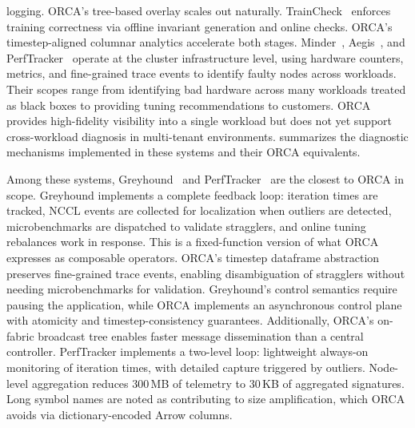 logging.
ORCA's tree-based overlay scales out naturally.
TrainCheck~\cite{Jiang2025:TrainCheck} enforces training correctness via
offline invariant generation and online checks.
ORCA's timestep-aligned
columnar analytics accelerate both stages.
Minder~\cite{Deng2025:Minder},
Aegis~\cite{Dong2025:Aegis}, and PerfTracker~\cite{Guan2025:PerfTracker} operate at the cluster
infrastructure level,
using hardware counters, metrics, and fine-grained trace events to identify faulty nodes across
workloads.
Their scopes range from identifying bad hardware across many workloads treated as black boxes to
providing tuning recommendations to customers.
ORCA provides
high-fidelity visibility into a single workload but does not yet support
cross-workload diagnosis in multi-tenant environments.
 summarizes the diagnostic mechanisms implemented in these systems and
their ORCA equivalents.

Among these systems, Greyhound~\cite{Wu2025:GREYHOUND} and PerfTracker~\cite{Guan2025:PerfTracker}
are the closest to
ORCA in scope.
Greyhound implements a complete feedback loop: iteration times are
tracked, NCCL events are collected for localization when outliers are
detected, microbenchmarks are dispatched to validate stragglers, and online
tuning rebalances work in response.
This is a fixed-function version of what ORCA expresses as composable operators.
ORCA's timestep dataframe abstraction preserves fine-grained trace events,
enabling disambiguation of stragglers without needing microbenchmarks for validation.
Greyhound's control semantics require pausing the application,
while ORCA implements an asynchronous control plane with atomicity and timestep-consistency
guarantees.
Additionally, ORCA's on-fabric broadcast tree enables faster message dissemination than a central
controller.
PerfTracker implements a two-level loop: lightweight always-on monitoring of iteration times, with
detailed capture triggered by outliers.
Node-level aggregation reduces 300\,MB of telemetry to 30\,KB of aggregated signatures.
Long symbol names are noted as contributing to size amplification, which ORCA avoids via
dictionary-encoded Arrow columns.

